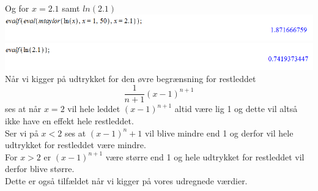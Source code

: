 \documentclass[12pt]{article}
\begin{document}
Og for $x=2.1$ samt $ln(2.1)$\\
\includegraphics[scale=0.6]{Pic7}\\
\includegraphics[scale=0.6]{Pic10}\\
Når vi kigger på udtrykket for den øvre begrænsning for restleddet
$$\frac{1}{n+1}(x-1)^{n+1}$$
ses at når $x=2$ vil hele leddet $(x-1)^{n+1}$ altid være lig 1 og dette vil altså ikke have en effekt hele restleddet.\\
Ser vi på $x<2$ ses at $(x-1)^n+1$ vil blive mindre end 1 og derfor vil hele udtrykket for restleddet være mindre.\\
For $x>2$ er $(x-1)^{n+1}$ være større end 1 og hele udtrykket for restleddet vil derfor blive større.\\
Dette er også tilfældet når vi kigger på vores udregnede værdier.
\end{document}
